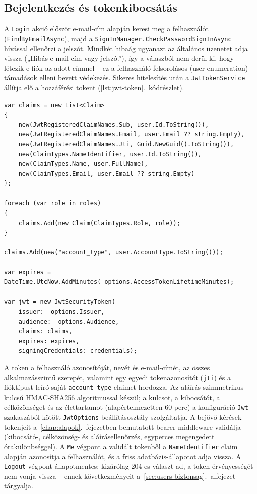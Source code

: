 \subsection{Bejelentkezés és tokenkibocsátás}

A \texttt{Login} akció először e-mail-cím alapján keresi meg a felhasználót
(\texttt{FindByEmailAsync}), majd a \texttt{SignInManager.CheckPasswordSignInAsync} hívással
ellenőrzi a jelszót. Mindkét hibaág ugyanazt az általános üzenetet adja vissza („Hibás e-mail cím
vagy jelszó.”), így a válaszból nem derül ki, hogy létezik-e fiók az adott címmel -- ez a
felhasználó-felsorolásos (user enumeration) támadások elleni bevett védekezés. Sikeres hitelesítés
után a \texttt{JwtTokenService} állítja elő a hozzáférési tokent
(\ref{lst:jwt-token}.~kódrészlet).

\begin{lstlisting}[language={[Sharp]C}, caption={A JWT előállítása a \texttt{JwtTokenService} osztályban (kivonat)}, label={lst:jwt-token}]
var claims = new List<Claim>
{
    new(JwtRegisteredClaimNames.Sub, user.Id.ToString()),
    new(JwtRegisteredClaimNames.Email, user.Email ?? string.Empty),
    new(JwtRegisteredClaimNames.Jti, Guid.NewGuid().ToString()),
    new(ClaimTypes.NameIdentifier, user.Id.ToString()),
    new(ClaimTypes.Name, user.FullName),
    new(ClaimTypes.Email, user.Email ?? string.Empty)
};

foreach (var role in roles)
{
    claims.Add(new Claim(ClaimTypes.Role, role));
}

claims.Add(new("account_type", user.AccountType.ToString()));

var expires = DateTime.UtcNow.AddMinutes(_options.AccessTokenLifetimeMinutes);

var jwt = new JwtSecurityToken(
    issuer: _options.Issuer,
    audience: _options.Audience,
    claims: claims,
    expires: expires,
    signingCredentials: credentials);
\end{lstlisting}

A token a felhasználó azonosítóját, nevét és e-mail-címét, az összes alkalmazásszintű szerepét,
valamint egy egyedi tokenazonosítót (\texttt{jti}) és a fióktípust leíró saját
\texttt{account\_type} claimet hordozza. Az aláírás szimmetrikus kulcsú HMAC-SHA256 algoritmussal
készül; a kulcsot, a kibocsátót, a célközönséget és az élettartamot (alapértelmezetten 60 perc) a
konfiguráció \texttt{Jwt} szakaszából kötött \texttt{JwtOptions} beállításosztály szolgáltatja. A
bejövő kérések tokenjeit a~\ref{chap:alapok}.~fejezetben bemutatott bearer-middleware validálja
(kibocsátó-, célközönség- és aláírásellenőrzés, egyperces megengedett órakülönbséggel). A
\texttt{Me} végpont a validált tokenből a \texttt{NameIdentifier} claim alapján azonosítja a
felhasználót, és a friss adatbázis-állapotot adja vissza. A \texttt{Logout} végpont állapotmentes:
kizárólag 204-es választ ad, a token érvényességét nem vonja vissza -- ennek következményeit
a~\ref{sec:users-biztonsag}.~alfejezet tárgyalja.

